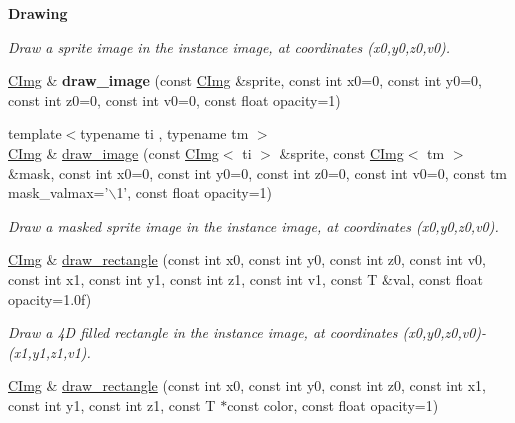 \begin{Indent}{\bf Drawing}
\begin{DoxyCompactItemize}
\begin{DoxyCompactList}\small\item\em Draw a sprite image in the instance image, at coordinates ({\ttfamily x0},{\ttfamily y0},{\ttfamily z0},{\ttfamily v0}). \item\end{DoxyCompactList}\item 
\hypertarget{structcimg__library_1_1_c_img_ab7fc8e76548f0e420484d2a7567295d9}{
\hyperlink{structcimg__library_1_1_c_img}{CImg} \& {\bfseries draw\_\-image} (const \hyperlink{structcimg__library_1_1_c_img}{CImg} \&sprite, const int x0=0, const int y0=0, const int z0=0, const int v0=0, const float opacity=1)}
\label{structcimg__library_1_1_c_img_ab7fc8e76548f0e420484d2a7567295d9}

\item 
{\footnotesize template$<$typename ti , typename tm $>$ }\\\hyperlink{structcimg__library_1_1_c_img}{CImg} \& \hyperlink{structcimg__library_1_1_c_img_a3cd6c29636f0d08ceaff2a2a5ea0b88b}{draw\_\-image} (const \hyperlink{structcimg__library_1_1_c_img}{CImg}$<$ ti $>$ \&sprite, const \hyperlink{structcimg__library_1_1_c_img}{CImg}$<$ tm $>$ \&mask, const int x0=0, const int y0=0, const int z0=0, const int v0=0, const tm mask\_\-valmax='$\backslash$1', const float opacity=1)
\begin{DoxyCompactList}\small\item\em Draw a masked sprite image in the instance image, at coordinates ({\ttfamily x0},{\ttfamily y0},{\ttfamily z0},{\ttfamily v0}). \item\end{DoxyCompactList}\item 
\hyperlink{structcimg__library_1_1_c_img}{CImg} \& \hyperlink{structcimg__library_1_1_c_img_ad05cf69b3e05554a549aef4d76996739}{draw\_\-rectangle} (const int x0, const int y0, const int z0, const int v0, const int x1, const int y1, const int z1, const int v1, const T \&val, const float opacity=1.0f)
\begin{DoxyCompactList}\small\item\em Draw a 4D filled rectangle in the instance image, at coordinates ({\ttfamily x0},{\ttfamily y0},{\ttfamily z0},{\ttfamily v0})-\/({\ttfamily x1},{\ttfamily y1},{\ttfamily z1},{\ttfamily v1}). \item\end{DoxyCompactList}\item 
\hyperlink{structcimg__library_1_1_c_img}{CImg} \& \hyperlink{structcimg__library_1_1_c_img_ac9bbf8259f593b243fb6db2aa7fdbd26}{draw\_\-rectangle} (const int x0, const int y0, const int z0, const int x1, const int y1, const int z1, const T $\ast$const color, const float opacity=1)

\end{DoxyCompactItemize}
\end{Indent}
